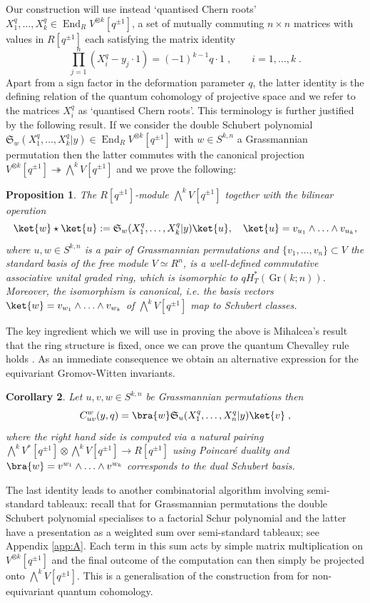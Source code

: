 \documentclass[12pt]{amsart}
\newcommand{\Gr}{\,\mathrm{Gr}}
\newcommand{\fS}{\mathfrak{S}}
\newcommand{\End}{\operatorname{End}}
\newcommand{\ring}{R}
\newtheorem{prop}{Proposition}[section]
\newtheorem{cor}[prop]{Corollary}
\numberwithin{equation}{section}
\numberwithin{figure}{section}
\begin{document}
Our construction will use instead `quantised Chern roots' $X^q_1,\ldots,X^q_k\in\End_{\ring} V^{\otimes k}[q^{\pm 1}]$, a set of mutually commuting $n\times n$ matrices with values in $\ring[q^{\pm 1}]$ each satisfying the matrix identity
\begin{equation}\label{intro:BAE}
    \prod_{j=1}^n(X_i^q-y_j\cdot1)=(-1)^{k-1}q\cdot 1\;,\qquad i=1,\ldots,k\;.
\end{equation}
Apart from a sign factor in the deformation parameter $q$, the latter identity is the defining relation of the quantum cohomology of projective space and we refer to the matrices $X^q_i$ as `quantised Chern roots'. This terminology is further justified by the following result. If we consider the double Schubert polynomial $\fS_w(X_1^q,\ldots,X^q_k|y)\in\End_{\ring} V^{\otimes k}[q^{\pm 1}]$ with $w\in S^{k,n}$ a Grassmannian permutation then the latter commutes with the canonical projection $V^{\otimes k}[q^{\pm 1}]\twoheadrightarrow\bigwedge^kV[q^{\pm 1}]$ and we prove the following:
\begin{prop}\label{intro:quantumSatake}
    The $\ring[q^{\pm1}]$-module $\bigwedge^kV[q^{\pm1}]$ together with the bilinear operation
    \[
    \ket{w}\star\ket{u}:=\fS_w(X_1^q,\ldots,X^q_k|y)\ket{u},\quad 
    \ket{u}=v_{u_1}\wedge\ldots\wedge v_{u_k},
    \]
    where $u,w\in S^{k,n}$ is a pair of Grassmannian permutations and $\{v_1,\ldots,v_n\}\subset V$ the standard basis of the free module $V\simeq \ring^n$, is a well-defined commutative associative unital graded ring, which is isomorphic to $qH^*_T(\Gr(k;n))$. Moreover, the isomorphism is canonical, i.e. the basis vectors $\ket{w}=v_{w_1}\wedge\ldots\wedge v_{w_k}$ of $\bigwedge^kV[q^{\pm 1}]$ map to Schubert classes.
\end{prop}

The key ingredient which we will use in proving the above is Mihalcea's result that the ring structure is fixed, once we can prove the quantum Chevalley rule holds \cite[Cor.7.1]{MihalceaAIM}. As an immediate consequence we obtain an alternative expression for the equivariant Gromov-Witten invariants.
\begin{cor}
    Let $u,v,w\in S^{k,n}$ be Grassmannian permutations then
    \[
    C^w_{uv}(y,q)=\bra{w}\fS_u(X_1^q,\ldots,X_n^q|y)\ket{v}\;,
    \]
    where the right hand side is computed via a natural pairing $\bigwedge^kV^*[q^{\pm 1}]\otimes\bigwedge^kV[q^{\pm 1}]\to\ring[q^{\pm 1}]$ using Poincar\'e duality and $\bra{w}=v^{w_1}\wedge\ldots\wedge v^{w_k}$ corresponds to the dual Schubert basis.
\end{cor}
The last identity leads to another combinatorial algorithm involving semi-standard tableaux: recall that for Grassmannian permutations the double Schubert polynomial specialises to a factorial Schur polynomial and the latter have a presentation as a weighted sum over semi-standard tableaux; see Appendix \ref{app:A}. Each term in this sum acts by simple matrix multiplication on $V^{\otimes k}[q^{\pm 1}]$ and the final outcome of the computation can then simply be projected onto $\bigwedge^kV[q^{\pm 1}]$. This is a generalisation of the construction from \cite[Section 4.2 and 5.7]{korff2020cylindric} for non-equivariant quantum cohomology.
\end{document}
